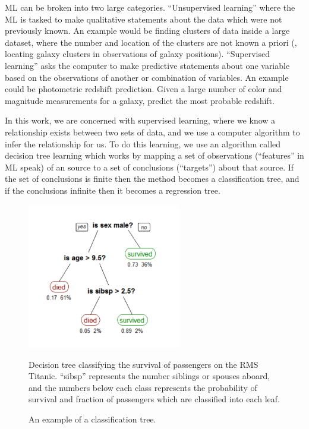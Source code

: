 ML can be broken into two large categories. ``Unsupervised learning'' where the ML is tasked to make qualitative statements about the data which were not previously known. An example would be finding clusters of data inside a large dataset, where the number and location of the clusters are not known a priori (\eg, locating galaxy clusters in observations of galaxy positions). ``Supervised learning'' asks the computer to make predictive statements about one variable based on the observations of another or combination of variables. An example could be photometric redshift prediction. Given a large number of color and magnitude measurements for a galaxy, predict the most probable redshift.  

In this work, we are concerned with supervised learning, where we know a relationship exists between two sets of data, and we use a computer algorithm to infer the relationship for us. To do this learning, we use an algorithm called decision tree learning which works by mapping a set of observations (``features'' in ML speak) of an source to a set of conclusions (``targets'') about that source. If the set of conclusions is finite then the method becomes a classification tree, and if the conclusions infinite then it becomes a regression tree. 

\begin{figure}[ht]
	\begin{center}
		\includegraphics[width=0.6\textwidth]{figures/CART_tree_titanic_survivors.pdf} 
	\end{center}
	\caption{An example of a classification tree.}
	Decision tree classifying the survival of passengers on the RMS Titanic. ``sibsp'' represents the number siblings or spouses aboard, and the numbers below each class represents the probability of survival and fraction of passengers which are classified into each leaf. 
	\label{fig: cart tree} 
\end{figure}


